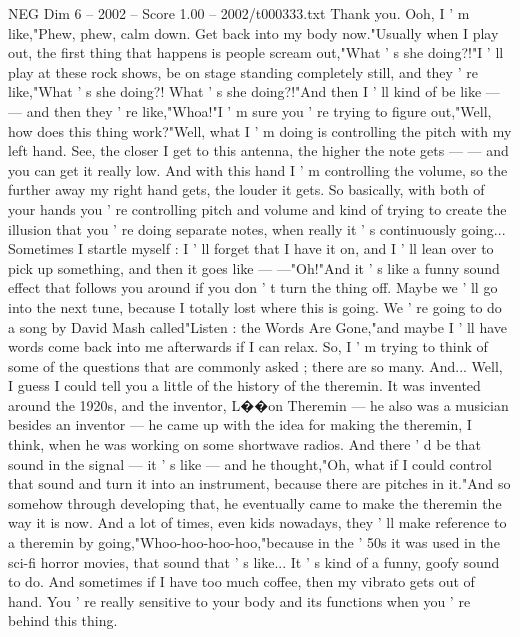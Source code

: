 \begin{textsample}{NEG Dim 6 – 2002 – Score 1.00 – 2002/t000333.txt}  \label{ex:f6_neg_074}
Thank you.
Ooh, I ' m like,"Phew, phew, calm down.
Get back into my body now."Usually when I play out, the first thing that happens is people scream out,"What ' s she doing?!"I ' ll play at these rock shows, be on stage standing completely still, and they ' re like,"What ' s she doing?!
What ' s she doing?!"And then I ' ll kind of be like — — and then they ' re like,"Whoa!"I ' m sure you ' re trying to figure out,"Well, how does this thing work?"Well, what I ' m doing is controlling the pitch with my left hand.
See, the closer I get to this antenna, the higher the note gets — — and you can get it really low.
And with this hand I ' m controlling the volume, so the further away my right hand gets, the louder it gets.
So basically, with both of your hands you ' re controlling pitch and volume and kind of trying to create the illusion that you ' re doing separate notes, when really it ' s continuously going...
Sometimes I startle myself : I ' ll forget that I have it on, and I ' ll lean over to pick up something, and then it goes like — —"Oh!"And it ' s like a funny sound effect that follows you around if you don ' t turn the thing off.
Maybe we ' ll go into the next tune, because I totally lost where this is going.
We ' re going to do a song by David Mash called"Listen : the Words Are Gone,"and maybe I ' ll have words come back into me afterwards if I can relax.
So, I ' m trying to think of some of the questions that are commonly asked ; there are so many.
And...
Well, I guess I could tell you a little of the history of the theremin.
It was invented around the 1920s, and the inventor, L{\EmojiFont �}{\EmojiFont �}on Theremin — he also was a musician besides an inventor — he came up with the idea for making the theremin, I think, when he was working on some shortwave radios.
And there ' d be that sound in the signal — it ' s like — and he thought,"Oh, what if I could control that sound and turn it into an instrument, because there are pitches in it."And so somehow through developing that, he eventually came to make the theremin the way it is now.
And a lot of times, even kids nowadays, they ' ll make reference to a theremin by going,"Whoo-hoo-hoo-hoo,"because in the ' 50s it was used in the sci-fi horror movies, that sound that ' s like...
It ' s kind of a funny, goofy sound to do.
And sometimes if I have too much coffee, then my vibrato gets out of hand.
You ' re really sensitive to your body and its functions when you ' re behind this thing.

\end{textsample}
